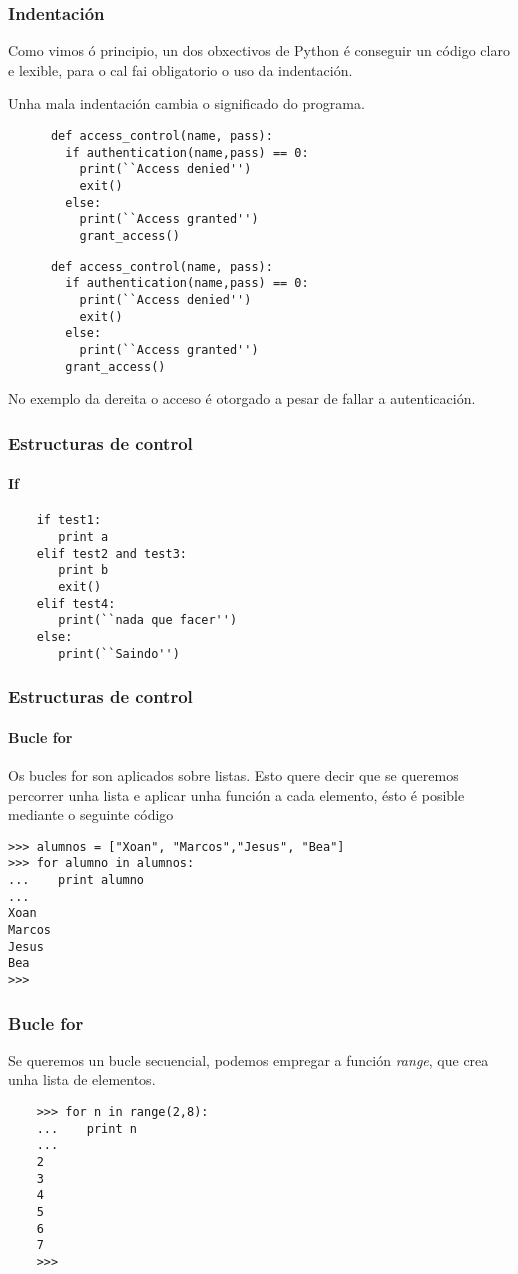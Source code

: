 \begin{frame}[fragile]
  \frametitle{Indentación}
  Como vimos ó principio, un dos obxectivos de Python é conseguir un código
  claro e lexible, para o cal fai obligatorio o uso da indentación.

  Unha mala indentación cambia o significado do programa.
  \begin{multicols}{2}
    \begin{lstlisting}
      def access_control(name, pass):
        if authentication(name,pass) == 0:
          print(``Access denied'')
          exit()
        else:
          print(``Access granted'')
          grant_access()
    \end{lstlisting}
    \columnbreak
    \begin{lstlisting}
      def access_control(name, pass):
        if authentication(name,pass) == 0:
          print(``Access denied'')
          exit()
        else:
          print(``Access granted'')
        grant_access()
    \end{lstlisting}
  \end{multicols}
  No exemplo da dereita o acceso é otorgado a pesar de fallar a autenticación.
\end{frame}

\begin{frame}[fragile]
  \frametitle{Estructuras de control}
  \framesubtitle{If}
  \small
  \begin{verbatim}
    if test1:
       print a
    elif test2 and test3:
       print b
       exit()
    elif test4:
       print(``nada que facer'')
    else:
       print(``Saindo'')
  \end{verbatim}
  \normalsize
\end{frame}

\begin{frame}[fragile]
  \frametitle{Estructuras de control}
  \framesubtitle{Bucle for}
  Os bucles for son aplicados sobre listas. Esto quere decir que se queremos
  percorrer unha lista e aplicar unha función a cada elemento, ésto é posible
  mediante o seguinte código
  \small
\begin{verbatim}
>>> alumnos = ["Xoan", "Marcos","Jesus", "Bea"]
>>> for alumno in alumnos:
...    print alumno
... 
Xoan
Marcos
Jesus
Bea
>>> 
\end{verbatim}
  \normalsize
\end{frame}

\begin{frame}[fragile]
  \frametitle{Bucle for}
  Se queremos un bucle secuencial, podemos empregar a función \emph{range}, que
  crea unha lista de elementos.
  \small
  \begin{verbatim}
    >>> for n in range(2,8):
    ...    print n
    ... 
    2
    3
    4
    5
    6
    7
    >>> 
  \end{verbatim}
  \normalsize
\end{frame}

